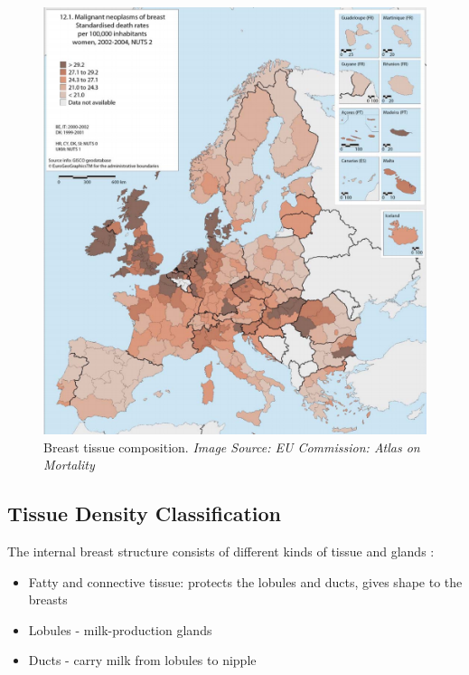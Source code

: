 \begin{figure}[!h]
  \center
  \includegraphics[scale=0.5]{Chapter1/background-img/mortality_EU_Comms.png}
  \caption{Breast tissue composition. \textit{Image Source: EU Commission: Atlas on Mortality \cite{European_Commission_2009}}}
  \label{fig:mortality-band}
\end{figure}

\subsection{Tissue Density Classification}

The internal breast structure consists of different kinds of tissue and glands \cite{Anatomy_breast}:

\begin{itemize}
  \item Fatty and connective tissue: protects the lobules and ducts, gives shape to the breasts
  \item Lobules - milk-production glands
  \item Ducts - carry milk from lobules to nipple
\end{itemize}

